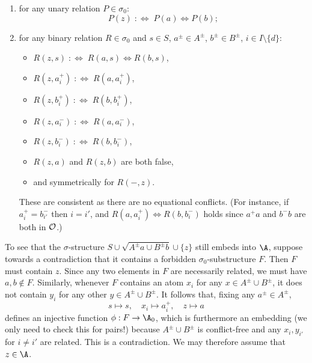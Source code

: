 \begin{claimproof}
\begin{enumerate}
    \item for any unary relation $P \in \sigma_0$:
    \[
        P(z) \;:\Longleftrightarrow\; P(a) \iff P(b);
    \]
    \item for any binary relation $R \in \sigma_0$ and $s \in S$, $a^\pm \in A^\pm$, $b^\pm \in B^\pm$, $i \in I \setminus \{d\}$:
    \begin{itemize}
        \item $R(z, s) \;:\Longleftrightarrow\; R(a, s) \iff R(b, s)$,
        \item $R(z, a^+_i) \;:\Longleftrightarrow\; R(a, a^+_i)$,
        \item $R(z, b^+_i) \;:\Longleftrightarrow\; R(b, b^+_i)$,
        \item $R(z, a^-_i) \;:\Longleftrightarrow\; R(a, a^-_i)$,
        \item $R(z, b^-_i) \;:\Longleftrightarrow\; R(b, b^-_i)$,
        \item $R(z, a)$ and $R(z,b)$ are both false,
        \item and symmetrically for $R(-, z)$.
    \end{itemize}
    These are consistent as there are no equational conflicts.
    (For instance, if $a^+_i = b^-_{i'}$ then $i = i'$, and $R(a, a^+_i) \iff R(b, b^-_i)$ holds since $a^+ a$ and $b^- b$ are both in $\cal O$.)
\end{enumerate}
To see that the $\sigma$-structure $S \cup \sqrt{A^\pm a \cup B^\pm b} \cup \{z\}$ still embeds into $\A$, 
suppose towards a contradiction that it contains a forbidden $\sigma_0$-substructure $F$.
Then $F$ must contain $z$.
Since any two elements in $F$ are necessarily related, we must have $a, b \not\in F$.
Similarly, whenever $F$ contains an atom $x_i$ for any $x\in A^\pm\cup B^\pm$, it does not contain $y_i$ for any other $y\in A^\pm\cup B^\pm$.
It follows that, fixing any $a^\pm\in A^\pm$,
\[
    s \mapsto s,\quad x_i \mapsto a^+_i,\quad z \mapsto a
\]
defines an injective function $\phi : F \to \A_0$,
which is furthermore an embedding (we only need to check this for pairs!) because $A^\pm \cup B^\pm$ is conflict-free and any $x_i, y_{i'}$ for $i \neq i'$ are related.
This is a contradiction. We may therefore assume that $z \in \A$.


\end{claimproof}
